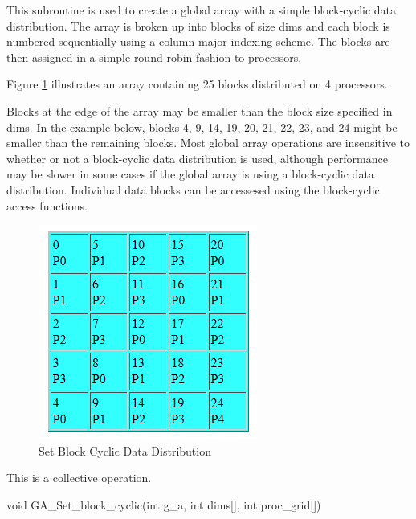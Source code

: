 \documentclass[12pt]{article}
\begin{document}
\begin{desc}

  This subroutine is used to create a global array with a simple
  block-cyclic data distribution. The array is broken up into blocks
  of size dims and each block is numbered sequentially using a column
  major indexing scheme. The blocks are then assigned in a simple
  round-robin fashion to processors. 

Figure \ref{stblkcy} illustrates an array containing 25 blocks distributed on 4 processors.

  Blocks at the edge of the array may be smaller than the block size
  specified in dims. In the example below, blocks
  4, 9, 14, 19, 20, 21, 22, 23, and 24 might be smaller than the remaining
  blocks. Most global array operations are insensitive to whether or
  not a block-cyclic data distribution is used, although performance
  may be slower in some cases if the global array is using a
  block-cyclic data distribution. Individual data blocks can be
  accessesed using the block-cyclic access functions.

\begin{figure}
\centering
\includegraphics{StBlkCy}
\caption{Set Block Cyclic Data Distribution}
\label{stblkcy}
\end{figure}

  This is a collective operation.

\end{desc}


\begin{capi}
\begin{ccode}
void GA_Set_block_cyclic(int g_a, int dims[], int proc_grid[])
\end{ccode}
\begin{funcargs}
\end{funcargs}
\end{capi}
\end{document}
